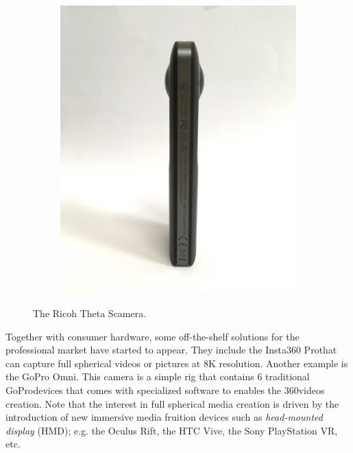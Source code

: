 \begin{figure}[htb]
\begin{subfigure}{0.3\textwidth}
	\end{subfigure}
	\begin{subfigure}{0.3\textwidth}
		\centering
		\includegraphics[width=\textwidth]{img/theta3}
	\end{subfigure}
	\caption{The Ricoh Theta S\degree camera.}
    \label{fig:ricoh_theta}
\end{figure}

Together with consumer hardware, some off-the-shelf
solutions for the professional market have started to appear. They include the Insta360
Pro\registered that can capture full spherical videos or pictures
at 8K resolution.
Another example is the GoPro Omni\registered. This camera is a simple 
rig that contains 6 traditional GoPro\registered devices that comes with 
specialized software to enables the 360\degree videos creation. Note that the interest in full spherical media creation is driven by the introduction of new immersive media fruition devices such as \textit{head-mounted display} (HMD); e.g. the Oculus Rift, the HTC Vive, the Sony PlayStation VR, etc.

